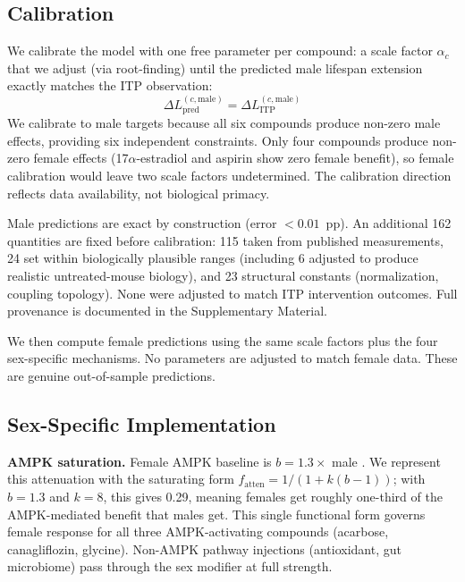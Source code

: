 \documentclass[11pt]{article}
\begin{document}
\subsection{Calibration}

We calibrate the model with one free parameter per compound: a scale factor $\alpha_c$ that we adjust (via root-finding) until the predicted male lifespan extension exactly matches the ITP observation:
\begin{equation}
\Delta L_{\text{pred}}^{(c, \text{male})} = \Delta L_{\text{ITP}}^{(c, \text{male})}
\end{equation}
We calibrate to male targets because all six compounds produce non-zero male effects, providing six independent constraints. Only four compounds produce non-zero female effects (17$\alpha$-estradiol and aspirin show zero female benefit), so female calibration would leave two scale factors undetermined. The calibration direction reflects data availability, not biological primacy.

Male predictions are exact by construction (error $< 0.01$~pp). An additional 162 quantities are fixed before calibration: 115 taken from published measurements, 24 set within biologically plausible ranges (including 6 adjusted to produce realistic untreated-mouse biology), and 23 structural constants (normalization, coupling topology). None were adjusted to match ITP intervention outcomes. Full provenance is documented in the Supplementary Material.

We then compute female predictions using the same scale factors plus the four sex-specific mechanisms. No parameters are adjusted to match female data. These are genuine out-of-sample predictions.

\subsection{Sex-Specific Implementation}

\textbf{AMPK saturation.} Female AMPK baseline is $b = 1.3\times$ male \citep{Boudaba2018,McInnes2011}. We represent this attenuation with the saturating form $f_{\text{atten}} = 1/(1 + k(b - 1))$; with $b = 1.3$ and $k = 8$, this gives 0.29, meaning females get roughly one-third of the AMPK-mediated benefit that males get. This single functional form governs female response for all three AMPK-activating compounds (acarbose, canagliflozin, glycine). Non-AMPK pathway injections (antioxidant, gut microbiome) pass through the sex modifier at full strength.
\end{document}
